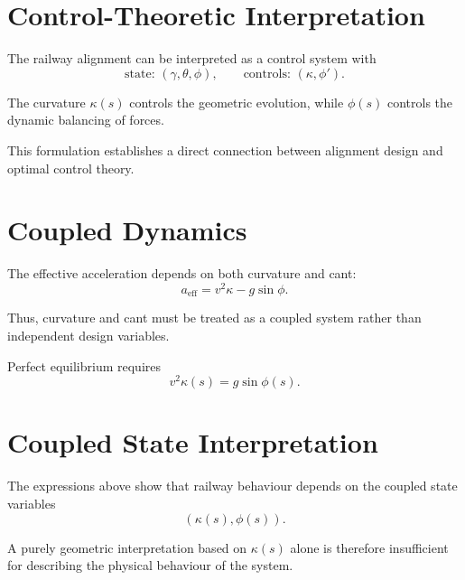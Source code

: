 \section{Control-Theoretic Interpretation}

\begin{definition}
The railway alignment can be interpreted as a control system with
\[
\text{state: } (\gamma, \theta, \phi),
\qquad
\text{controls: } (\kappa, \phi').
\]
\end{definition}

\begin{remark}
The curvature \(\kappa(s)\) controls the geometric evolution,
while \(\phi(s)\) controls the dynamic balancing of forces.
\end{remark}

\begin{remark}
This formulation establishes a direct connection between alignment
design and optimal control theory.
\end{remark}

\section{Coupled Dynamics}

\begin{remark}
The effective acceleration depends on both curvature and cant:
\[
a_{\mathrm{eff}} = v^2 \kappa - g \sin\phi.
\]
\end{remark}

\begin{remark}
Thus, curvature and cant must be treated as a coupled system rather
than independent design variables.
\end{remark}

\begin{proposition}
Perfect equilibrium requires
\[
v^2 \kappa(s) = g \sin\phi(s).
\]
\end{proposition}

\section{Coupled State Interpretation}

\begin{remark}
The expressions above show that railway behaviour depends on the coupled
state variables
\[
(\kappa(s), \phi(s)).
\]
\end{remark}

\begin{remark}
A purely geometric interpretation based on $\kappa(s)$ alone is therefore
insufficient for describing the physical behaviour of the system.
\end{remark}

